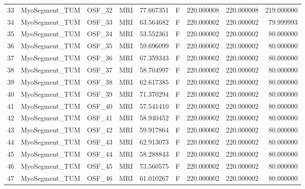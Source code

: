 \begin{tabular}{llllrlrrr}
33     &  MyoSegment\_TUM &       OSF\_32 &                MRI &  77.667351 &        F &       220.000008 &    220.000008 &  219.000000 \\
34     &  MyoSegment\_TUM &       OSF\_33 &                MRI &  63.564682 &        F &       220.000002 &    220.000002 &   79.999993 \\
35     &  MyoSegment\_TUM &       OSF\_34 &                MRI &  53.552361 &        F &       220.000002 &    220.000002 &   80.000000 \\
36     &  MyoSegment\_TUM &       OSF\_35 &                MRI &  59.696099 &        F &       220.000002 &    220.000002 &   80.000000 \\
37     &  MyoSegment\_TUM &       OSF\_36 &                MRI &  67.359343 &        F &       220.000002 &    220.000002 &   80.000000 \\
38     &  MyoSegment\_TUM &       OSF\_37 &                MRI &  58.704997 &        F &       220.000002 &    220.000002 &   80.000000 \\
39     &  MyoSegment\_TUM &       OSF\_38 &                MRI &  62.617385 &        F &       220.000002 &    220.000002 &   80.000000 \\
40     &  MyoSegment\_TUM &       OSF\_39 &                MRI &  71.370294 &        F &       220.000002 &    220.000002 &   80.000000 \\
41     &  MyoSegment\_TUM &       OSF\_40 &                MRI &  57.541410 &        F &       220.000002 &    220.000002 &   80.000000 \\
42     &  MyoSegment\_TUM &       OSF\_41 &                MRI &  58.940452 &        F &       220.000002 &    220.000002 &   80.000000 \\
43     &  MyoSegment\_TUM &       OSF\_42 &                MRI &  59.917864 &        F &       220.000002 &    220.000002 &   80.000000 \\
44     &  MyoSegment\_TUM &       OSF\_43 &                MRI &  62.913073 &        F &       220.000002 &    220.000002 &   80.000000 \\
45     &  MyoSegment\_TUM &       OSF\_44 &                MRI &  58.288843 &        F &       220.000002 &    220.000002 &   80.000000 \\
46     &  MyoSegment\_TUM &       OSF\_45 &                MRI &  73.560575 &        F &       220.000002 &    220.000002 &   80.000000 \\
47     &  MyoSegment\_TUM &       OSF\_46 &                MRI &  61.010267 &        F &       220.000002 &    220.000002 &   80.000000 \\

\end{tabular}
